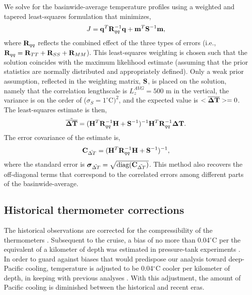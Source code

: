 \documentclass[12pt]{article}
\begin{document}
We solve for the basinwide-average temperature profiles using a
weighted and tapered least-squares formulation that minimizes, 
\begin{equation}
\label{eq:qWq}
J = {\bf q}^T {\bf R}_{qq}^{-1} {\bf q} + {\bf m}^T {\bf S}^{-1} {\bf m},
\end{equation}  
where ${\bf R}_{qq}$ reflects the combined effect of the three types of errors (i.e., ${\bf R}_{qq} = {\bf R}_{TT} + {\bf R}_{SS} + {\bf R}_{MM}$). This least-squares weighting %
is chosen such that the solution coincides with the maximum likelihood estimate (assuming that the prior statistics are normally distributed and appropriately defined).
Only a weak prior assumption, reflected in the weighting matrix, ${\bf
  S}$, is placed on the solution, namely that the correlation
lengthscale is $L_z^{AVG} = 500$ m in the vertical, the variance is on the order of
($\sigma_S = 1^\circ$C$)^2$, and the expected value is $<\overline{{\boldsymbol \Delta}{\bf T}}>=0$.
The least-squares estimate is then,
\begin{equation}
\tilde{\overline{{\boldsymbol \Delta}{\bf T}}} = ({\bf H}^T {\bf R}_{qq}^{-1} {\bf H} + {\bf S}^{-1} )^{-1} {\bf H}^T {\bf R}_{qq}^{-1} {\boldsymbol \Delta}{\bf T}.
\end{equation}
 The error covariance of the estimate is,
\begin{equation}
  \label{eq:covariance17}
  \mbox{{\bf C}}_{{\tilde{\Delta T}}} = ({\bf H}^T {\bf R}_{qq}^{-1} {\bf H} + {\bf S}^{-1} )^{-1},
\end{equation}
where the standard error is
${\boldsymbol \sigma}_{\tilde{\Delta T}} =
\sqrt{\mbox{diag}(\mbox{{\bf C}}_{{\tilde{\Delta T}}})}$.  This method
also recovers the off-diagonal terms that correspond to the correlated
errors among different parts of the basinwide-average.

\subsection{Historical thermometer corrections}

The historical observations are corrected for the
compressibility of the thermometers \cite{Tait--1882:Pressure}.
Subsequent to the cruise, a bias of no more than 0.04$^\circ$C per the
equivalent of a kilometer of depth was estimated in pressure-tank
experiments \cite{Tait--1882:Pressure}. In order to guard against
biases that would predispose our analysis toward deep-Pacific cooling,
temperature is adjusted to be 0.04$^\circ$C cooler per kilometer of
depth, in keeping with previous analyses
\cite{Roemmich-Gould-2012:135}. With this adjustment, the amount of
Pacific cooling is diminished between the historical and recent eras.
\end{document}

